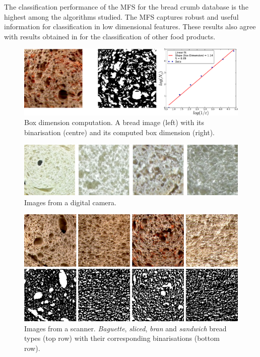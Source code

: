 \documentclass[spanish,a4paper,11pt,oneside,links]{report}
\begin{document}
The classification performance of the MFS for the bread crumb database is the highest a\-mong the algorithms studied. The MFS captures robust and useful information for classification in low dimensional features. These results also agree with results obtained in \cite{Bosch2011} for the classification of other food products.

\begin{figure}[h!]
\centering
\includegraphics{dimensionbox}
\caption{Box dimension computation. A bread image (left) with its binarisation (centre) and its computed box dimension (right).}
\label{fig:fitbox}
\end{figure}

\begin{figure}[h!]
\centering
\includegraphics{pancamara}
\caption{Images from a digital camera.}
\label{fig:camera}
\end{figure}

\begin{figure}[h!]
\centering
\includegraphics{binarizaciones}
\caption{Images from a scanner. {\em Baguette}, {\em sliced}, {\em bran} and {\em sandwich} bread types (top row) with their corresponding binarisations (bottom row).}
\label{fig:bread}
\end{figure}
\end{document}
